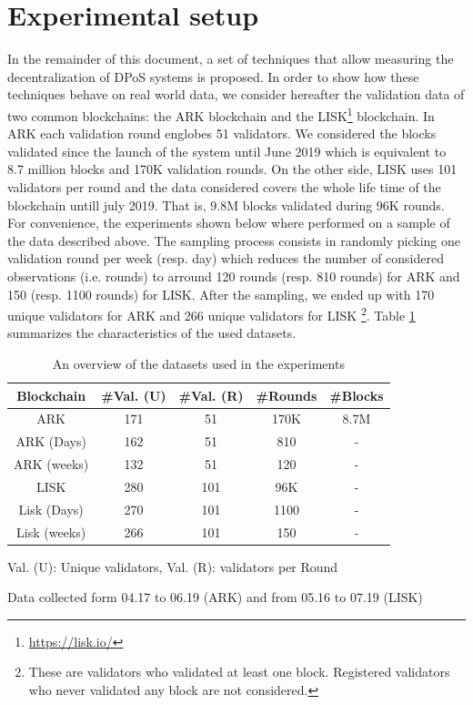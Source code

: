 \documentclass{article}
\begin{document}
\section{Experimental setup}
In the remainder of this document, a set of techniques that allow measuring the decentralization of DPoS systems is proposed. In order to show how these techniques behave on real world data, we consider hereafter the validation data of two common blockchains: the ARK blockchain and the LISK\footnote{\url{https://lisk.io/}} blockchain. In ARK each validation round englobes 51 validators. We considered the blocks validated since the launch of the system until June 2019 which is equivalent to 8.7 million blocks and 170K validation rounds. On the other side, LISK uses 101 validators per round and the data considered covers the whole life time of the blockchain untill july 2019. That is, 9.8M blocks validated during 96K rounds. For convenience, the experiments shown below where performed on a sample of the data described above. The sampling process consists in randomly picking one validation round per week (resp. day) which reduces the number of considered observations (i.e. rounds) to arround 120 rounds (resp. 810 rounds) for ARK and 150 (resp. 1100 rounds) for LISK. After the sampling, we ended up with 170 unique validators for ARK and 266 unique validators for LISK \footnote{These are validators who validated at least one block. Registered validators who never validated any block are not considered.}. Table \ref{tab:data} summarizes the characteristics of the used datasets.

\begin{table}[]
\centering
 \begin{threeparttable}
 \begin{tabular}{|c c c c c|}
 \hline
 Blockchain & \#Val. (U) & \#Val. (R) & \#Rounds & \#Blocks  \\ [0.5ex]
 \hline\hline
 ARK & 171 & 51 & 170K & 8.7M  \\ [1ex]
 ARK (Days)  & 162 & 51 & 810 & - \\ [1ex]
 ARK (weeks) & 132 & 51 & 120 & - \\ [1ex]
 LISK & 280 & 101 & 96K & - \\[1ex]
 Lisk (Days) & 270 & 101 & 1100 & - \\ [1ex]
 Lisk (weeks) & 266 & 101 &150 & - \\ [1ex]
 \hline
 \end{tabular}
     \begin{tablenotes}
     \centering
      \small
      \item Val. (U): Unique validators, Val. (R): validators per Round
      \item Data collected form 04.17 to 06.19 (ARK) and from 05.16 to 07.19 (LISK)
    \end{tablenotes}
 \end{threeparttable}
 \caption{An overview of the datasets used in the experiments}
 \label{tab:data}
\end{table}
\end{document}
